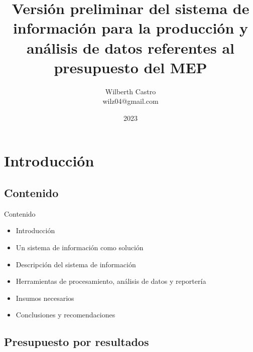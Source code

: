 \documentclass[xcolor=table, aspectratio=169]{beamer}
\title[Versi\'on preliminar del sistema]{Versi\'on preliminar del sistema de informaci\'on para la producci\'on y an\'alisis de datos referentes al presupuesto del MEP}
\author[WilC]
{
	Wilberth Castro \\
	\small{wilz04@gmail.com}
}
\date[10 Ago 2023]
{
	2023
}
\begin{document}
\begin{frame}
	\maketitle
\end{frame}
\section{Introducci\'on}

\subsection{Contenido}

\begin{frame}[t]{Contenido}
	\begin{itemize}
		\item Introducci\'on
		\item Un sistema de informaci\'on como soluci\'on
		\item Descripci\'on del sistema de informaci\'on
		\item Herramientas de procesamiento, an\'alisis de datos y reporter\'ia
		\item Insumos necesarios
		\item Conclusiones y recomendaciones
	\end{itemize}
\end{frame}

\subsection{Presupuesto por resultados}
\end{document}
